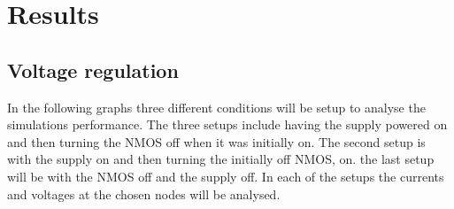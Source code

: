 \chapter{Results}\label{chap:res}
\section{Voltage regulation}
In the following graphs three different conditions will be setup to analyse the simulations performance. The three setups include having the supply powered on and then turning the NMOS off when it was initially on. The second setup is with the supply on and then turning the initially off NMOS, on. the last setup will be with the NMOS off and the supply off. In each of the setups the currents and voltages at the chosen nodes will be analysed.


